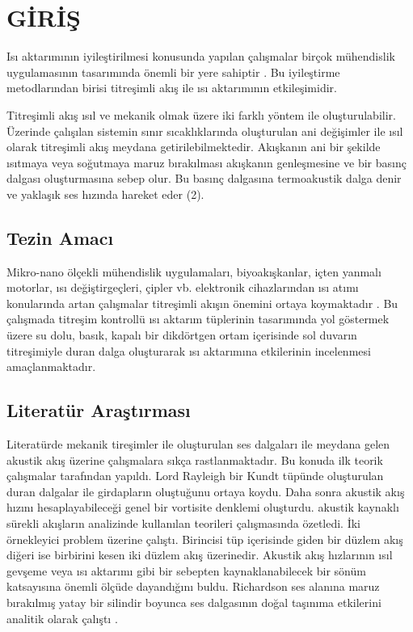 \documentclass[a4paper, 12pt, oneside]{Etuthesis}
\begin{document}
{
\setlength{\parskip}{10pt}
\section{GİRİŞ}

Isı aktarımının iyileştirilmesi konusunda yapılan çalışmalar birçok mühendislik uygulamasının tasarımında önemli bir yere sahiptir \cite{Reference1}. Bu iyileştirme metodlarından birisi titreşimli akış ile ısı aktarımının etkileşimidir. 

Titreşimli akış ısıl ve mekanik olmak üzere iki farklı yöntem ile oluşturulabilir. Üzerinde çalışılan sistemin sınır sıcaklıklarında oluşturulan ani değişimler ile ısıl olarak titreşimli akış meydana getirilebilmektedir. Akışkanın ani bir şekilde ısıtmaya veya soğutmaya maruz bırakılması akışkanın genleşmesine ve bir basınç dalgası oluşturmasına sebep olur. Bu basınç dalgasına termoakustik dalga denir ve yaklaşık ses hızında hareket eder (2).

\subsection{Tezin Amacı}

Mikro-nano ölçekli mühendislik uygulamaları, biyoakışkanlar, içten yanmalı motorlar, ısı değiştirgeçleri, çipler vb. elektronik cihazlarından ısı atımı konularında artan çalışmalar titreşimli akışın önemini ortaya koymaktadır \cite{Reference2}. Bu çalışmada titreşim kontrollü ısı aktarım tüplerinin tasarımında yol göstermek üzere su dolu, basık, kapalı bir dikdörtgen ortam içerisinde sol duvarın titreşimiyle duran dalga oluşturarak ısı aktarımına etkilerinin incelenmesi amaçlanmaktadır.

\subsection{Literatür Araştırması}

Literatürde mekanik tireşimler ile oluşturulan ses dalgaları ile meydana gelen akustik akış üzerine çalışmalara sıkça rastlanmaktadır. Bu konuda ilk teorik çalışmalar \cite{Reference3} tarafından yapıldı. Lord Rayleigh bir Kundt tüpünde oluşturulan duran dalgalar ile girdapların oluştuğunu ortaya koydu. Daha sonra  akustik akış hızını hesaplayabileceği genel bir vortisite denklemi oluşturdu.  akustik kaynaklı sürekli akışların analizinde kullanılan teorileri çalışmasında özetledi. İki örnekleyici problem üzerine çalıştı. Birincisi tüp içerisinde giden bir düzlem akış diğeri ise birbirini kesen iki düzlem akış üzerinedir. Akustik akış hızlarının ısıl gevşeme veya ısı aktarımı gibi bir sebepten kaynaklanabilecek bir sönüm katsayısına önemli ölçüde dayandığını buldu. Richardson ses alanına maruz bırakılmış yatay bir silindir boyunca ses dalgasının doğal taşınıma etkilerini analitik olarak çalıştı . 

}
\end{document}
